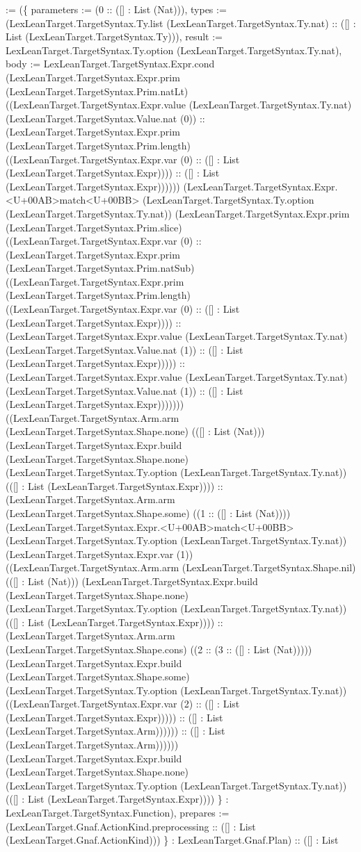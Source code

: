 \documentclass[11pt]{article}
\begin{document}
:= (\{ parameters := (0 :: ([] : List (Nat))), types := (LexLeanTarget.TargetSyntax.Ty.list (LexLeanTarget.TargetSyntax.Ty.nat) :: ([] : List (LexLeanTarget.TargetSyntax.Ty))), result := LexLeanTarget.TargetSyntax.Ty.option (LexLeanTarget.TargetSyntax.Ty.nat), body := LexLeanTarget.TargetSyntax.Expr.cond (LexLeanTarget.TargetSyntax.Expr.prim (LexLeanTarget.TargetSyntax.Prim.natLt) ((LexLeanTarget.TargetSyntax.Expr.value (LexLeanTarget.TargetSyntax.Ty.nat) (LexLeanTarget.TargetSyntax.Value.nat (0)) :: (LexLeanTarget.TargetSyntax.Expr.prim (LexLeanTarget.TargetSyntax.Prim.length) ((LexLeanTarget.TargetSyntax.Expr.var (0) :: ([] : List (LexLeanTarget.TargetSyntax.Expr)))) :: ([] : List (LexLeanTarget.TargetSyntax.Expr)))))) (LexLeanTarget.TargetSyntax.Expr.<U+00AB>match<U+00BB> (LexLeanTarget.TargetSyntax.Ty.option (LexLeanTarget.TargetSyntax.Ty.nat)) (LexLeanTarget.TargetSyntax.Expr.prim (LexLeanTarget.TargetSyntax.Prim.slice) ((LexLeanTarget.TargetSyntax.Expr.var (0) :: (LexLeanTarget.TargetSyntax.Expr.prim (LexLeanTarget.TargetSyntax.Prim.natSub) ((LexLeanTarget.TargetSyntax.Expr.prim (LexLeanTarget.TargetSyntax.Prim.length) ((LexLeanTarget.TargetSyntax.Expr.var (0) :: ([] : List (LexLeanTarget.TargetSyntax.Expr)))) :: (LexLeanTarget.TargetSyntax.Expr.value (LexLeanTarget.TargetSyntax.Ty.nat) (LexLeanTarget.TargetSyntax.Value.nat (1)) :: ([] : List (LexLeanTarget.TargetSyntax.Expr))))) :: (LexLeanTarget.TargetSyntax.Expr.value (LexLeanTarget.TargetSyntax.Ty.nat) (LexLeanTarget.TargetSyntax.Value.nat (1)) :: ([] : List (LexLeanTarget.TargetSyntax.Expr))))))) ((LexLeanTarget.TargetSyntax.Arm.arm (LexLeanTarget.TargetSyntax.Shape.none) (([] : List (Nat))) (LexLeanTarget.TargetSyntax.Expr.build (LexLeanTarget.TargetSyntax.Shape.none) (LexLeanTarget.TargetSyntax.Ty.option (LexLeanTarget.TargetSyntax.Ty.nat)) (([] : List (LexLeanTarget.TargetSyntax.Expr)))) :: (LexLeanTarget.TargetSyntax.Arm.arm (LexLeanTarget.TargetSyntax.Shape.some) ((1 :: ([] : List (Nat)))) (LexLeanTarget.TargetSyntax.Expr.<U+00AB>match<U+00BB> (LexLeanTarget.TargetSyntax.Ty.option (LexLeanTarget.TargetSyntax.Ty.nat)) (LexLeanTarget.TargetSyntax.Expr.var (1)) ((LexLeanTarget.TargetSyntax.Arm.arm (LexLeanTarget.TargetSyntax.Shape.nil) (([] : List (Nat))) (LexLeanTarget.TargetSyntax.Expr.build (LexLeanTarget.TargetSyntax.Shape.none) (LexLeanTarget.TargetSyntax.Ty.option (LexLeanTarget.TargetSyntax.Ty.nat)) (([] : List (LexLeanTarget.TargetSyntax.Expr)))) :: (LexLeanTarget.TargetSyntax.Arm.arm (LexLeanTarget.TargetSyntax.Shape.cons) ((2 :: (3 :: ([] : List (Nat))))) (LexLeanTarget.TargetSyntax.Expr.build (LexLeanTarget.TargetSyntax.Shape.some) (LexLeanTarget.TargetSyntax.Ty.option (LexLeanTarget.TargetSyntax.Ty.nat)) ((LexLeanTarget.TargetSyntax.Expr.var (2) :: ([] : List (LexLeanTarget.TargetSyntax.Expr))))) :: ([] : List (LexLeanTarget.TargetSyntax.Arm)))))) :: ([] : List (LexLeanTarget.TargetSyntax.Arm)))))) (LexLeanTarget.TargetSyntax.Expr.build (LexLeanTarget.TargetSyntax.Shape.none) (LexLeanTarget.TargetSyntax.Ty.option (LexLeanTarget.TargetSyntax.Ty.nat)) (([] : List (LexLeanTarget.TargetSyntax.Expr)))) \} : LexLeanTarget.TargetSyntax.Function), prepares := (LexLeanTarget.Gnaf.ActionKind.preprocessing :: ([] : List (LexLeanTarget.Gnaf.ActionKind))) \} : LexLeanTarget.Gnaf.Plan) :: ([] : List 
\end{document}
